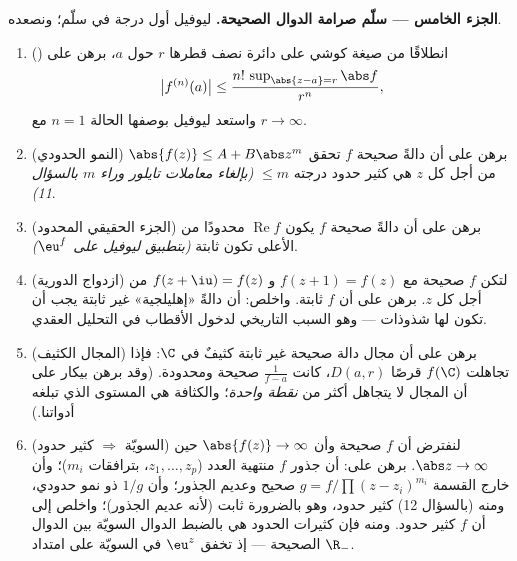 \begin{problem}
\medskip
\noindent\textbf{الجزء الخامس --- سلّم صرامة الدوال الصحيحة.}
ليوفيل أول درجة في سلّم؛ ونصعده.
\begin{enumerate}[resume]
  \item () انطلاقًا من صيغة كوشي على دائرة نصف
        قطرها $r$ حول $a$، برهن على
        \[
        \bigl|f^{(n)}(a)\bigr| \leq
        \frac{n!\,\sup_{\abs{z-a}=r}\abs f}{r^n} ,
        \]
        واستعد ليوفيل بوصفها الحالة $n = 1$ مع $r \to
        \infty$.
  \item (النمو الحدودي) برهن على أن دالةً صحيحة $f$ تحقق
        $\abs{f(z)} \leq A + B\abs z^m$ من أجل كل $z$ هي كثير حدود درجته $\leq m$
        \emph{(بإلغاء معاملات تايلور وراء $m$ بالسؤال 11)}.
  \item (الجزء الحقيقي المحدود) برهن على أن دالةً صحيحة $f$
        يكون $\operatorname{Re}f$ محدودًا من الأعلى تكون ثابتة \emph{(بتطبيق
        ليوفيل على $\eu^{f}$)}.
  \item (ازدواج الدورية) لتكن $f$ صحيحة مع $f(z + 1)
        = f(z)$ و $f(z + \iu) = f(z)$ من
        أجل كل $z$. برهن على أن $f$ ثابتة. واخلص: أن دالةً
        «إهليلجية» غير ثابتة يجب أن تكون لها شذوذات --- وهو
        السبب التاريخي لدخول الأقطاب في التحليل العقدي.
  \item (المجال الكثيف) برهن على أن مجال دالة صحيحة غير ثابتة
        كثيفٌ في $\C$: فإذا تجاهلت $f(\C)$ قرصًا $D(a, r)$،
        كانت $\frac1{f - a}$ صحيحة ومحدودة. (وقد برهن بيكار
        على أن المجال لا يتجاهل أكثر من \emph{نقطة واحدة}؛
        والكثافة هي المستوى الذي تبلغه أدواتنا.)
  \item (السويّة $\Rightarrow$ كثير حدود) لنفترض أن $f$ صحيحة
        وأن $\abs{f(z)} \to \infty$ حين $\abs z \to
        \infty$. برهن على: أن جذور $f$ منتهية
        العدد ($z_1, \dots, z_p$، بترافقات $m_i$)؛ وأن خارج القسمة
        $g = f/\prod(z - z_i)^{m_i}$ صحيح وعديم الجذور؛ وأن $1/g$ ذو نمو حدودي،
        ومنه (بالسؤال 12) كثير حدود، وهو بالضرورة ثابت (لأنه
        عديم الجذور)؛ واخلص إلى أن $f$ كثير حدود. ومنه فإن
        كثيرات الحدود هي بالضبط الدوال السويّة بين الدوال
        الصحيحة --- إذ تخفق $\eu^z$ في السويّة على امتداد
        $\R_-$.
\end{enumerate}


\end{problem}
